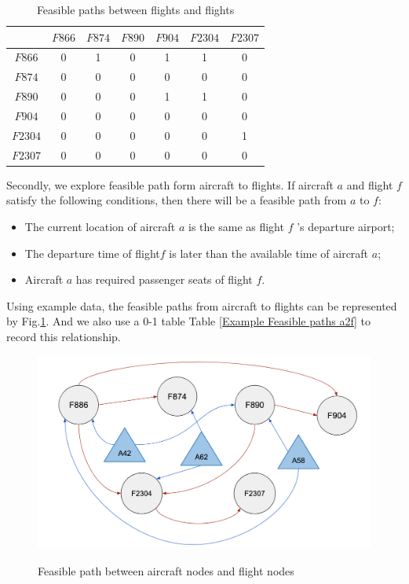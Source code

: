 \documentclass[senior]{IPSstyle}
\begin{document}
\begin{table}[h]
\renewcommand{\arraystretch}{1}
\label{table:f2f}
\begin{center}
\begin{tabular}{|c|c|c|c|c|c|c|}
\hline
\multicolumn{1}{|c|}{}
&\multicolumn{1}{|c|}{\(F866\)}
&\multicolumn{1}{c|}{\(F874\)}
&\multicolumn{1}{c|}{\(F890\)}
&\multicolumn{1}{c|}{\(F904\)}
&\multicolumn{1}{c|}{\(F2304\)}
&\multicolumn{1}{c|}{\(F2307\)}

\\  \hline
\(F866\) & 0 & 1 & 0 & 1 & 1 & 0
\\	\hline
\(F874\) & 0 & 0 & 0 & 0 & 0 & 0
\\	\hline
\(F890\) & 0 & 0 & 0 & 1 & 1 & 0
\\  \hline
\(F904\) & 0 & 0 & 0 & 0 & 0 & 0
\\  \hline
\(F2304\) & 0 & 0 & 0 & 0 & 0 & 1
\\  \hline
\(F2307\) & 0 & 0 & 0 & 0 & 0 & 0
\\  \hline
\end{tabular}
\caption{Feasible paths between flights and flights}
\end{center}
\end{table}

Secondly, we explore feasible path form aircraft to flights.
If aircraft \(a\) and flight \(f\) satisfy the following conditions, then there will be a feasible path from \(a\) to \(f\):
\begin{itemize}
    \item The current location of aircraft \(a\) is the same as flight \(f\) ’s departure airport;
    \item The departure time of flight\(f\) is later than the available time of aircraft \(a\);
    \item Aircraft \(a\) has required passenger seats of flight \(f\).
\end{itemize}
Using example data, the feasible paths from aircraft to flights can be represented by Fig.\ref{fig:a2f}. And we also use a 0-1 table Table \ref{Example Feasible paths a2f} to record this relationship.

\begin{figure}[h]
    \centering
    \includegraphics[width=15cm]{MasterThesis-master/a2f.png}\\
    \caption{Feasible path between aircraft nodes and flight nodes}
    \label{fig:a2f}
\end{figure}
\end{document}
